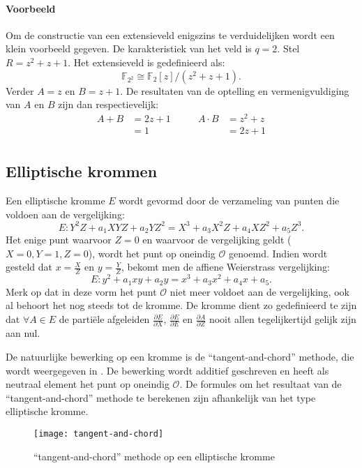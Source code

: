 \paragraph{Voorbeeld} Om de constructie van een extensieveld enigszins te verduidelijken wordt een klein voorbeeld gegeven. De karakteristiek van het veld is $q = 2$. Stel $R = z^2 + z + 1$. Het extensieveld is gedefinieerd als:
\[\mathbb{F}_{2^2} \cong \mathbb{F}_2 [z] / (z^2 + z + 1). \]
Verder $A = z$ en $B = z + 1$. De resultaten van de optelling en vermenigvuldiging van $A$ en $B$ zijn dan respectievelijk:
\[\begin{aligned}
A + B &= 2z + 1 \qquad & A \cdot B &= z^2 + z\\
&= 1	& &= 2z + 1\\
\end{aligned}\]

\subsection{Elliptische krommen}

Een elliptische kromme $E$ wordt gevormd door de verzameling van punten die voldoen aan de vergelijking:
\[E: Y^2 Z + a_1 XYZ + a_2 Y Z^2 = X^3 + a_3 X^2 Z + a_4 X Z^2 + a_5 Z^3.\]
Het enige punt waarvoor $Z = 0$ en waarvoor de vergelijking geldt ($X = 0,  Y = 1, Z = 0$), wordt het punt op oneindig $\mathcal{O}$ genoemd. Indien wordt gesteld dat $x = \frac{X}{Z}$ en $y = \frac{Y}{Z}$, bekomt men de affiene Weierstrass vergelijking:
\[E: y^2 + a_1 xy + a_2 y = x^3 + a_3 x^2 + a_4 x + a_5.\]
Merk op dat in deze vorm het punt $\mathcal{O}$ niet meer voldoet aan de vergelijking, ook al behoort het nog steeds tot de kromme. De kromme dient zo gedefinieerd te zijn dat $\forall A \in E$ de parti\"ele afgeleiden $\frac{\partial E}{\partial X}$, $\frac{\partial E}{\partial E}$ en $\frac{\partial A}{\partial Z}$ nooit allen tegelijkertijd gelijk zijn aan nul.

De natuurlijke bewerking op een kromme is de ``tangent-and-chord'' methode, die wordt weergegeven in . De bewerking wordt additief geschreven en heeft als neutraal element het punt op oneindig $\mathcal{O}$. De formules om het resultaat van de ``tangent-and-chord'' methode te berekenen zijn afhankelijk van het type elliptische kromme.

\begin{figure}[h]
	\centering
		\texttt{[image: tangent-and-chord]}
		\caption{``tangent-and-chord'' methode op een elliptische kromme\label{figuur-paringen-tangent-and-chord}}
\end{figure}

